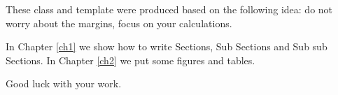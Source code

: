 These class and template were produced based on the following idea: do not worry about the margins, focus on your calculations.

In Chapter \ref{ch1} we show how to write Sections, Sub Sections and Sub sub Sections. In Chapter \ref{ch2} we put some figures and tables.

Good luck with your work.